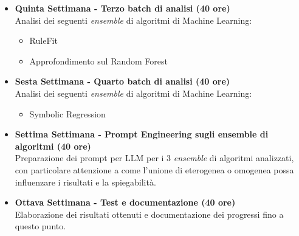 {\begin{itemize}
        \item \textbf{Quinta Settimana - Terzo batch di analisi (40 ore)} 
        \\Analisi dei seguenti \textit{ensemble} di algoritmi di Machine Learning:
        \begin{itemize}
            \item RuleFit
            \item Approfondimento sul Random Forest
        \end{itemize}
        \item \textbf{Sesta Settimana - Quarto batch di analisi (40 ore)} 
        \\Analisi dei seguenti \textit{ensemble} di algoritmi di Machine Learning:
        \begin{itemize}
            \item Symbolic Regression
        \end{itemize}
        \item \textbf{Settima Settimana - Prompt Engineering sugli ensemble di algoritmi (40 ore)} 
        \\ Preparazione dei prompt per LLM per i 3 \textit{ensemble} di algoritmi analizzati, con particolare attenzione a come l'unione di eterogenea o omogenea possa influenzare i risultati e la spiegabilità.

        \item \textbf{Ottava Settimana - Test e documentazione (40 ore)} 
        \\ Elaborazione dei risultati ottenuti e documentazione dei progressi fino a questo punto.

    \end{itemize}
}

\newcommand{\totaleOre}{320}

\newcommand{\obiettiviObbligatori}{
	 \item \underline{\textit{O01}}: Comprensione profonda degli algoritmi scelti;
	 \item \underline{\textit{O02}}: Comprensione delle tecniche di interpretabilità e spiegabilità dei modelli di Machine Learning;
	 \item \underline{\textit{O03}}: Comprensione delle tecniche di design di algoritmi;
	 \item \underline{\textit{O04}}: Preparazione di prompt per LLM per migliorare la comprensione e l'interpretabilità dei risultati ottenuti dagli algoritmi analizzati.
	 \item \underline{\textit{O05}}: Applicazione principi di Prompt Engineering
}

